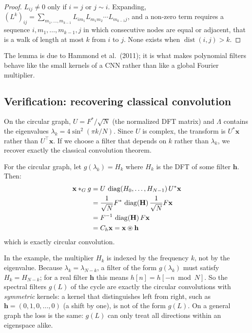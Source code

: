 \begin{notechapter}
\begin{proof}
$L_{ij} \ne 0$ only if $i = j$ or $j \sim i$. Expanding, $(L^k)_{ij} = \sum_{m_1,\ldots,m_{k-1}} L_{i m_1}L_{m_1m_2}\cdots L_{m_{k-1}j}$, and a non-zero term requires a sequence $i, m_1, \ldots, m_{k-1}, j$ in which consecutive nodes are equal or adjacent, that is a walk of length at most $k$ from $i$ to $j$. None exists when $\operatorname{dist}(i,j) > k$.
\end{proof}

The lemma is due to Hammond et al.\ (2011); it is what makes polynomial filters behave like the small kernels of a CNN rather than like a global Fourier multiplier.

\subsection{Verification: recovering classical convolution}

On the circular graph, $U = F^*/\sqrt{N}$ (the normalized DFT matrix)
and $\Lambda$ contains the eigenvalues $\lambda_k = 4\sin^2(\pi k/N)$. Since $U$ is complex, the transform is $U^*\mathbf{x}$ rather than $U^\top\mathbf{x}$.
If we choose a filter that depends on $k$ rather than $\lambda_k$, we
recover exactly the classical convolution theorem.

\begin{example}
For the circular graph, let $g(\lambda_k) = H_k$ where $H_k$ is the
DFT of some filter $\mathbf{h}$. Then:
\begin{align*}
\mathbf{x} *_G g &= U \, \operatorname{diag}(H_0, \ldots, H_{N-1}) \, U^* \mathbf{x} \\
&= \frac{1}{\sqrt{N}} F^* \, \operatorname{diag}(\mathbf{H}) \,
   \frac{1}{\sqrt{N}} F \mathbf{x} \\
&= F^{-1} \, \operatorname{diag}(\mathbf{H}) \, F \mathbf{x} \\
&= C_h \mathbf{x} = \mathbf{x} \circledast \mathbf{h}
\end{align*}
which is exactly circular convolution.
\end{example}

\begin{pitfall}
In the example, the multiplier $H_k$ is indexed by the frequency $k$, not by the eigenvalue. Because $\lambda_k = \lambda_{N-k}$, a filter of the form $g(\lambda_k)$ must satisfy $H_k = H_{N-k}$; for a real filter $\mathbf{h}$ this means $h[n] = h[-n \bmod N]$. So the spectral filters $g(L)$ of the cycle are exactly the circular convolutions with \emph{symmetric} kernels: a kernel that distinguishes left from right, such as $\mathbf{h} = (0, 1, 0, \ldots, 0)$ (a shift by one), is not of the form $g(L)$. On a general graph the loss is the same: $g(L)$ can only treat all directions within an eigenspace alike.
\end{pitfall}


\end{notechapter}
